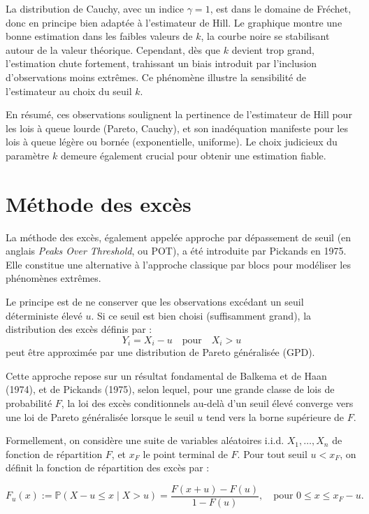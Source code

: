 \documentclass{article}
\begin{document}
La distribution de Cauchy, avec un indice $\gamma = 1$, est dans le domaine de Fréchet, donc en principe bien adaptée à l’estimateur de Hill. Le graphique montre une bonne estimation dans les faibles valeurs de $k$, la courbe noire se stabilisant autour de la valeur théorique. Cependant, dès que $k$ devient trop grand, l’estimation chute fortement, trahissant un biais introduit par l'inclusion d’observations moins extrêmes. Ce phénomène illustre la sensibilité de l’estimateur au choix du seuil $k$.
\medskip

En résumé, ces observations soulignent la pertinence de l’estimateur de Hill pour les lois à queue lourde (Pareto, Cauchy), et son inadéquation manifeste pour les lois à queue légère ou bornée (exponentielle, uniforme). Le choix judicieux du paramètre $k$ demeure également crucial pour obtenir une estimation fiable.

\section{Méthode des excès}

La méthode des excès, également appelée approche par dépassement de seuil (en anglais \textit{Peaks Over Threshold}, ou POT), a été introduite par Pickands en 1975. Elle constitue une alternative à l’approche classique par blocs pour modéliser les phénomènes extrêmes.

Le principe est de ne conserver que les observations excédant un seuil déterministe élevé \( u \). Si ce seuil est bien choisi (suffisamment grand), la distribution des excès définis par :
\[
Y_i = X_i - u \quad \text{pour} \quad X_i > u
\]
peut être approximée par une distribution de Pareto généralisée (GPD).

\medskip
Cette approche repose sur un résultat fondamental de Balkema et de Haan (1974), et de Pickands (1975), selon lequel, pour une grande classe de lois de probabilité \(F\), la loi des excès conditionnels au-delà d’un seuil élevé converge vers une loi de Pareto généralisée lorsque le seuil \(u\) tend vers la borne supérieure de \(F\).

\medskip
Formellement, on considère une suite de variables aléatoires i.i.d. \(X_1, \dots, X_n\) de fonction de répartition \(F\), et \(x_F\) le point terminal de \(F\). Pour tout seuil \(u < x_F\), on définit la fonction de répartition des excès par :

\[
F_u(x) := \mathbb{P}(X - u \leq x \mid X > u) = \frac{F(x + u) - F(u)}{1 - F(u)},
\quad \text{pour } 0 \leq x \leq x_F - u.
\]
\end{document}
